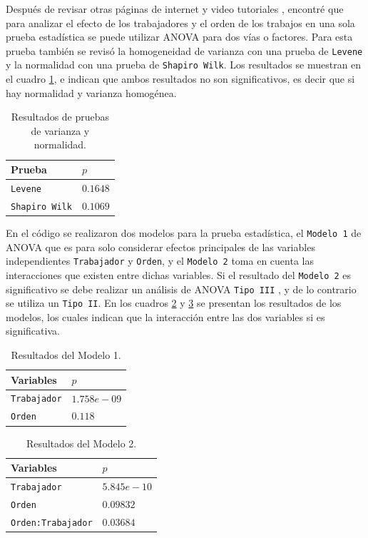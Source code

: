 \documentclass{article}
\begin{document}
Después de revisar otras páginas de internet y video tutoriales \citep{7}, encontré que para analizar el efecto de los trabajadores y el orden de los trabajos en una sola prueba estadística se puede utilizar ANOVA para dos vías o factores. Para esta prueba también se revisó la homogeneidad de varianza con una prueba de \texttt{Levene} y la normalidad con una prueba de \texttt{Shapiro Wilk}. Los resultados se muestran en el cuadro \ref{Cuadro 5}, e indican que ambos resultados no son significativos, es decir que si hay normalidad y varianza homogénea.

\begin{table}[ht]
\centering
\caption{Resultados de pruebas de varianza y normalidad.}
\smallskip

 \begin{tabular}{ |p{2.5cm}|p{1.5cm}|}
 \hline
 Prueba & $p$ \\
 \hline
 \texttt{Levene} & $0.1648$ \\
 \hline
 \texttt{Shapiro Wilk}  & $0.1069$ \\
 \hline
\end{tabular}
\label{Cuadro 5}
\end{table}

En el código se realizaron dos modelos para la prueba estadística, el \texttt{Modelo 1} de ANOVA que es para solo considerar efectos principales de las variables independientes \texttt{Trabajador} y \texttt{Orden}, y el \texttt{Modelo 2} toma en cuenta las interacciones que existen entre dichas variables. Si el resultado del \texttt{Modelo 2} es significativo se debe realizar un análisis de ANOVA \texttt{Tipo III} , y de lo contrario se utiliza un \texttt{Tipo II}. En los cuadros \ref{Cuadro 6} y \ref{Cuadro 7} se presentan los resultados de los modelos, los cuales indican que la interacción entre las dos variables si es significativa.

\begin{table}[ht]
\centering
\caption{Resultados del Modelo 1.}
\smallskip

 \begin{tabular}{ |p{2.5cm}|p{1.7cm}|}
 \hline
 Variables & $p$ \\
 \hline
 \texttt{Trabajador} & $1.758e-09$ \\
 \hline
 \texttt{Orden}  & $0.118$ \\
 \hline
\end{tabular}
\label{Cuadro 6}
\end{table}

\begin{table}[ht]
\centering
\caption{Resultados del Modelo 2.}
\smallskip

 \begin{tabular}{ |p{3cm}|p{2cm}|}
 \hline
 Variables & $p$ \\
 \hline
 \texttt{Trabajador} & $5.845e-10$ \\
 \hline
 \texttt{Orden}  & $0.09832$ \\
 \hline
  \texttt{Orden:Trabajador}  & $0.03684$ \\
 \hline
\end{tabular}
\label{Cuadro 7}
\end{table}
\end{document}
